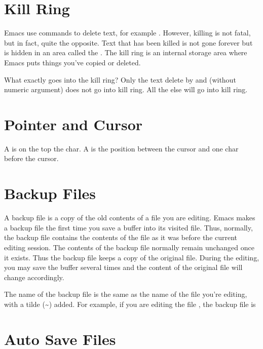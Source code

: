 \section{Kill Ring}
\label{sec:kill-ring}

Emacs use  commands to delete text, for example .
However, killing is not fatal, but in fact, quite the opposite.
Text that has been killed is not gone forever but is hidden in an area called the .
The kill ring is an internal storage area where Emacs puts things you’ve copied or deleted.



What exactly goes into the kill ring?
Only the text delete by  and  (without numeric argument) does not go into kill ring. All the else will go into kill ring.


\section{Pointer and Cursor}
\label{sec:pointer-mark}

A  is on the top the char.
A  is the position between the cursor and one char before the cursor.


\section{Backup Files}
\label{sec:backup-files}

A backup file is a copy of the old contents of a file you are editing.
Emacs makes a backup file the first time you save a buffer into its visited file.
Thus, normally, the backup file contains the contents of the file as it was before the current editing session.
The contents of the backup file normally remain unchanged once it exists.
Thus the backup file keeps a copy of the original file.
During the editing, you may save the buffer several times and the content of the original file will change accordingly.

The name of the backup file is the same as the name of the file you’re editing, with a tilde (\textasciitilde{}) added.
For example, if you are editing the file , the backup file is 


\section{Auto Save Files}
\label{sec:auto-save-files}

